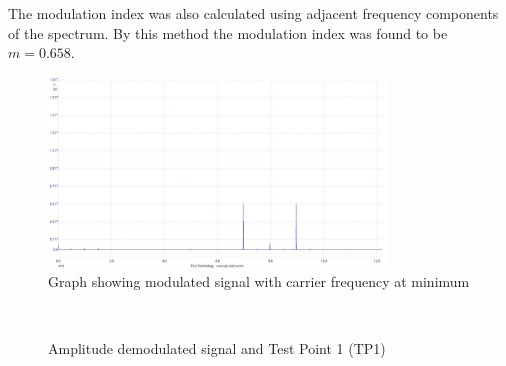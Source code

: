 \documentclass[12pt]{article}
\begin{document}
The modulation index was also calculated using adjacent frequency components of the spectrum.
By this method the modulation index was found to be $m=0.658$.

\begin{figure}[h]
    \centering
    \includegraphics[width=0.8\textwidth]{ampMod_carriermin_f.jpg}
    \caption{Graph showing modulated signal with carrier frequency at minimum}
    \label{fig:freq_responses}
\end{figure}

\begin{figure}[H]
    \\
    \vspace{-14pt}
    \caption{Amplitude demodulated signal and Test Point 1 (TP1)}
    \label{fig:Amplitude_Demodulated_Signal_TP1}
\end{figure}
\end{document}

